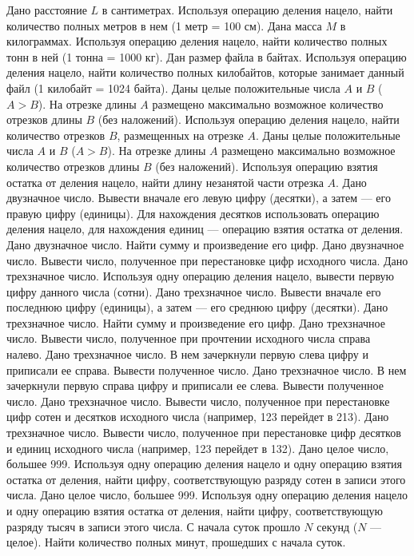 Дано расстояние $L$ в сантиметрах. Используя операцию деления нацело, найти количество полных метров в нем (1 метр = 100 см).
Дана масса $M$ в килограммах. Используя операцию деления нацело, найти количество полных тонн в ней (1 тонна = 1000 кг).
Дан размер файла в байтах. Используя операцию деления нацело, найти количество полных килобайтов, которые занимает данный файл (1 килобайт = 1024 байта).
Даны целые положительные числа $A$ и $B$ ($A > B$). На отрезке длины $A$ размещено максимально возможное количество отрезков длины $B$ (без наложений). Используя операцию деления нацело, найти количество отрезков $B$, размещенных на отрезке $A$.
Даны целые положительные числа $A$ и $B$ ($A > B$). На отрезке длины $A$ размещено максимально возможное количество отрезков длины $B$ (без наложений). Используя операцию взятия остатка от деления нацело, найти длину незанятой части отрезка $A$.
Дано двузначное число. Вывести вначале его левую цифру (десятки), а затем --- его правую цифру (единицы). Для нахождения десятков использовать операцию деления нацело, для нахождения единиц --- операцию взятия остатка от деления.
Дано двузначное число. Найти сумму и произведение его цифр.
Дано двузначное число. Вывести число, полученное при перестановке цифр исходного числа.
Дано трехзначное число. Используя одну операцию деления нацело, вывести первую цифру данного числа (сотни).
Дано трехзначное число. Вывести вначале его последнюю цифру (единицы), а затем --- его среднюю цифру (десятки).
Дано трехзначное число. Найти сумму и произведение его цифр.
Дано трехзначное число. Вывести число, полученное при прочтении исходного числа справа налево.
Дано трехзначное число. В нем зачеркнули первую слева цифру и приписали ее справа. Вывести полученное число.
Дано трехзначное число. В нем зачеркнули первую справа цифру и приписали ее слева. Вывести полученное число.
Дано трехзначное число. Вывести число, полученное при перестановке цифр сотен и десятков исходного числа (например, 123 перейдет в 213).
Дано трехзначное число. Вывести число, полученное при перестановке цифр десятков и единиц исходного числа (например, 123 перейдет в 132).
Дано целое число, большее 999. Используя одну операцию деления нацело и одну операцию взятия остатка от деления, найти цифру, соответствующую разряду сотен в записи этого числа.
Дано целое число, большее 999. Используя одну операцию деления нацело и одну операцию взятия остатка от деления, найти цифру, соответствующую разряду тысяч в записи этого числа.
С начала суток прошло $N$ секунд ($N$ --- целое). Найти количество полных минут, прошедших с начала суток.
